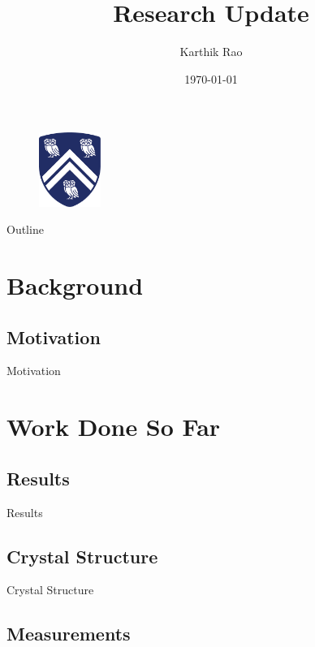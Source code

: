 \documentclass{beamer}
\title{Research Update}
\author{Karthik Rao}
\institute{
 Morosan Lab
 }
\date{\today}
\begin{document}
\begin{frame}[plain]

  \titlepage
\begin{figure}
    \includegraphics[width=2cm]{university-logo-filename.png}
\end{figure}

\end{frame}

\begin{frame}{Outline}
  \tableofcontents
\end{frame}
\section{Background}
\subsection{Motivation}

\begin{frame}{Motivation}

\end{frame}

\section{Work Done So Far}

\subsection{Results}

\begin{frame}{Results}
\end{frame}

\subsection{Crystal Structure}

\begin{frame}{Crystal Structure}
\end{frame}
\subsection{Measurements}
\end{document}
